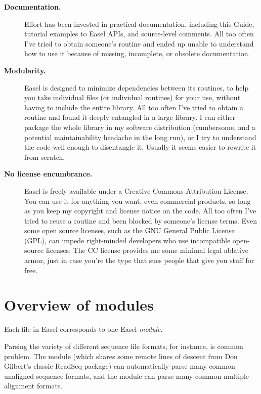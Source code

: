 \begin{description}
\item[\textbf{Documentation.}]  Effort has been invested in practical
documentation, including this Guide, tutorial examples to Easel APIs,
and source-level comments. All too often I've tried to obtain
someone's routine and ended up unable to understand how to use it
because of missing, incomplete, or obsolete documentation.

\item[\textbf{Modularity.}]  Easel is designed to minimize
dependencies between its routines, to help you take individual files
(or individual routines) for your use, without having to include the
entire library. All too often I've tried to obtain a routine and found
it deeply entangled in a large library. I can either package the whole
library in my software distribution (cumbersome, and a potential
maintainability headache in the long run), or I try to understand the
code well enough to disentangle it. Usually it seems easier to rewrite
it from scratch.

\item[\textbf{No license encumbrance.}]  Easel is freely available
under a Creative Commons Attribution License. You can use it for
anything you want, even commercial products, so long as you keep my
copyright and license notice on the code. All too often I've tried to
reuse a routine and been blocked by someone's license terms. Even some
open source licenses, such as the GNU General Public License (GPL),
can impede right-minded developers who use incompatible open-source
licenses. The CC license provides me some minimal legal ablative
armor, just in case you're the type that sues people that give you
stuff for free.
\end{description}

\section{Overview of modules}

Each  file in Easel corresponds to one Easel \emph{module}.

Parsing the variety of different sequence file formats, for instance,
is common problem. The  module (which shares some remote
lines of descent from Don Gilbert's classic ReadSeq package) can
automatically parse many common unaligned sequence formats, and the
 module can parse many common multiple alignment formats.

